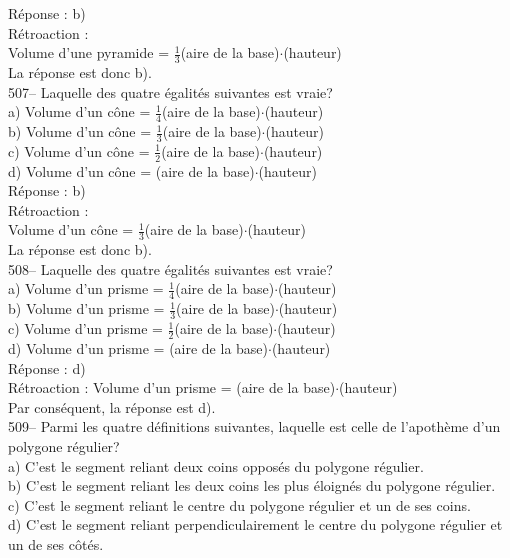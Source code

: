 ﻿\documentclass[letterpaper, 12pt]{article}
\begin{document}
R\'eponse : b)\\

R\'etroaction :  \\
Volume d'une pyramide = $\frac{1}{3}$(aire de la base)$\cdot$(hauteur)\\
La r\'eponse est donc b).\\

507-- Laquelle des quatre \'egalit\'es suivantes est vraie?\\
a) Volume d'un c\^one = $\frac{1}{4}$(aire de la
base)$\cdot$(hauteur)\\[2mm]
b) Volume d'un c\^one = $\frac{1}{3}$(aire de la
base)$\cdot$(hauteur)\\[2mm]
c) Volume d'un c\^one = $\frac{1}{2}$(aire de la
base)$\cdot$(hauteur)\\[2mm]
d) Volume d'un c\^one = (aire de la base)$\cdot$(hauteur)\\

R\'eponse : b)\\

R\'etroaction :  \\
Volume d'un c\^one = $\frac{1}{3}$(aire de la base)$\cdot$(hauteur)\\
La r\'eponse est donc b).\\

508-- Laquelle des quatre \'egalit\'es suivantes est vraie?\\
a) Volume d'un prisme = $\frac{1}{4}$(aire de la
base)$\cdot$(hauteur)\\[2mm]
b) Volume d'un prisme = $\frac{1}{3}$(aire de la
base)$\cdot$(hauteur)\\[2mm]
c) Volume d'un prisme = $\frac{1}{2}$(aire de la
base)$\cdot$(hauteur)\\[2mm]
d) Volume d'un prisme = (aire de la base)$\cdot$(hauteur)\\

R\'eponse : d)\\

R\'etroaction :
Volume d'un prisme = (aire de la base)$\cdot$(hauteur)\\
Par cons\'equent, la r\'eponse est d).\\

509-- Parmi les quatre d\'efinitions suivantes, laquelle est celle de
l'apoth\`eme d'un polygone r\'egulier?\\
a) C'est le segment reliant deux coins oppos\'es du polygone r\'egulier.\\
b) C'est le segment reliant les deux coins les plus \'eloign\'es du polygone
r\'egulier.\\
c) C'est le segment reliant le centre du polygone r\'egulier et un de ses
coins.\\
d) C'est le segment reliant perpendiculairement le centre du polygone
r\'egulier et un de ses c\^ot\'es.\\
\end{document}
